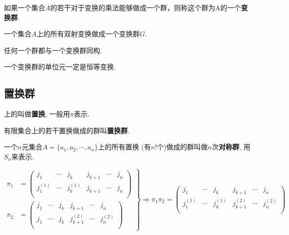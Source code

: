 \begin{Definition}[变换群]
如果一个集合$A$的若干\;\;对于变换的乘法能够做成一个群，则称这个群为A的一个\textbf{变换群}.
\end{Definition}

\begin{Theorem}
一个集合$A$上的所有双射变换做成一个变换群$G$.
\end{Theorem}

\begin{Theorem}
任何一个群都与一个变换群同构.
\end{Theorem}

\begin{Theorem}
一个变换群的单位元一定是恒等变换.
\end{Theorem}

\subsection{置换群} %

\begin{Definition}[置换]
\;上的\;\;叫做\textbf{置换}, 一般用$\pi$表示.
\end{Definition}

\begin{Definition}[置换群]
有限集合上的若干置换做成的群叫\textbf{置换群}.
\end{Definition}

\begin{Definition}[对称群]
一个$n$元集合$A = \{ a_1, a_2, \cdots, a_n \}$上的所有置换
(有$n!$个)做成的群叫做$n$次\textbf{对称群}, 用$S_n$来表示.
\end{Definition}

\begin{Theorem}
$$
\left.
\begin{aligned}
\pi_1 &= \begin{pmatrix} 
j_1       & \cdots & j_k       & j_{k+1} & \cdots & j_n \\
j_1^{(1)} & \cdots & j_k^{(1)} & j_{k+1} & \cdots & j_n \\
\end{pmatrix} \\
\pi_2 &= \begin{pmatrix} 
j_1       & \cdots & j_k       & j_{k+1}       & \cdots & j_n      \\
j_1       & \cdots & j_k       & j_{k+1}^{(2)} & \cdots & j_n^{(2)} \\
\end{pmatrix} 
\end{aligned}
\right\}
\Rightarrow
\pi_1 \pi_2 = \begin{pmatrix} 
j_1       & \cdots & j_k       & j_{k+1}       & \cdots & j_n \\
j_1^{(1)} & \cdots & j_k^{(1)} & j_{k+1}^{(2)} & \cdots & j_n^{(2)} \\
\end{pmatrix}
$$
\end{Theorem}

